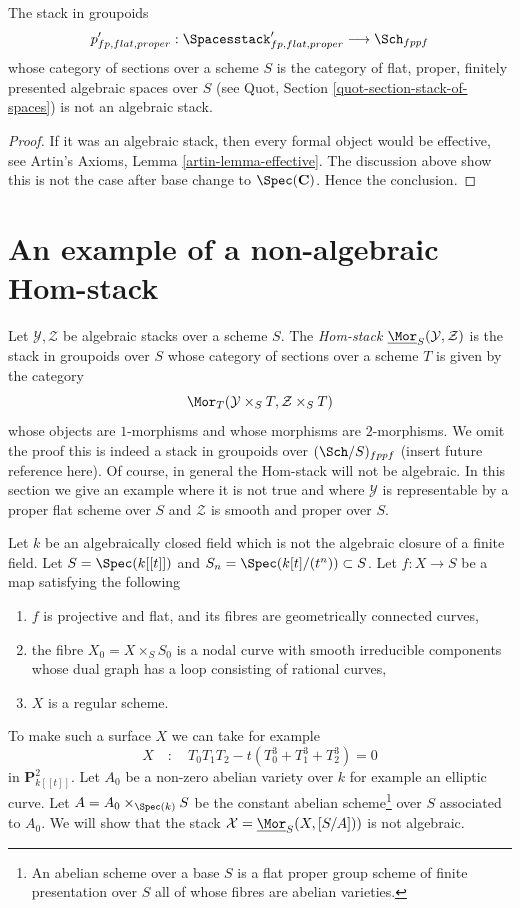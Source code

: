 \begin{lemma}
\label{lemma-proper-spaces-not-algebraic}
The stack in groupoids
$$
p'_{fp, flat, proper} :
\Spacesstack'_{fp, flat, proper}
\longrightarrow
\Sch_{fppf}
$$
whose category of sections over a scheme $S$ is the category of
flat, proper, finitely presented algebraic spaces over $S$
(see Quot, Section \ref{quot-section-stack-of-spaces})
is not an algebraic stack.
\end{lemma}

\begin{proof}
If it was an algebraic stack, then every formal object would be
effective, see Artin's Axioms, Lemma \ref{artin-lemma-effective}.
The discussion above show this is not the case
after base change to $\Spec(\mathbf{C})$.
Hence the conclusion.
\end{proof}






\section{An example of a non-algebraic Hom-stack}
\label{section-non-algebraic-hom-stack}

\noindent
Let $\mathcal{Y}, \mathcal{Z}$ be algebraic stacks over a scheme $S$.
The {\it Hom-stack} $\underline{\Mor}_S(\mathcal{Y}, \mathcal{Z})$
is the stack in groupoids over $S$ whose category of sections over
a scheme $T$ is given by the category
$$
\Mor_T(\mathcal{Y} \times_S T, \mathcal{Z} \times_S T)
$$
whose objects are $1$-morphisms and whose morphisms are $2$-morphisms.
We omit the proof this is indeed a stack in groupoids over
$(\Sch/S)_{fppf}$ (insert future reference here). Of course, in
general the Hom-stack will not be algebraic. In this section we
give an example where it is not true and where $\mathcal{Y}$ is
representable by a proper flat scheme over $S$ and $\mathcal{Z}$
is smooth and proper over $S$.

\medskip\noindent
Let $k$ be an algebraically closed field which is not the algebraic
closure of a finite field. Let $S = \Spec(k[[t]])$
and $S_n = \Spec(k[t]/(t^n)) \subset S$. Let $f : X \to S$ be a map
satisfying the following
\begin{enumerate}
\item $f$ is projective and flat, and its fibres are geometrically
connected curves,
\item the fibre $X_0 = X \times_S S_0$ is a nodal curve with smooth
irreducible components whose dual graph has a loop consisting of
rational curves,
\item $X$ is a regular scheme.
\end{enumerate}
To make such a surface $X$ we can take for example
$$
X\quad :\quad T_0T_1T_2 - t(T_0^3 + T_1^3 + T_2^3) = 0
$$
in $\mathbf{P}^2_{k[[t]]}$. Let $A_0$ be a non-zero abelian variety over $k$
for example an elliptic curve.  Let $A = A_0 \times_{\Spec(k)} S$ be the
constant abelian scheme\footnote{An abelian scheme over a base $S$ is
a flat proper group scheme of finite presentation over $S$ all of
whose fibres are abelian varieties.}
over $S$ associated to $A_0$. We will show that the
stack $\mathcal{X} = \underline{\Mor}_S(X, [S/A]))$ is not algebraic.

